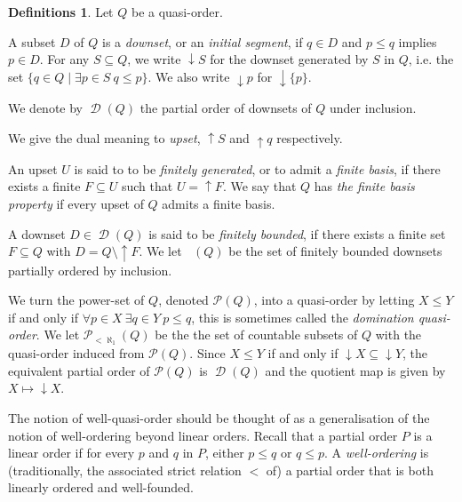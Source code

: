 \documentclass{article}%
\theoremstyle{plain}
\theoremstyle{definition}
\newtheorem{definition}[theorem]{Definition}
\newtheorem{definition}[theorem]{Notation}
\newtheorem{definition}[theorem]{Notations}
\newtheorem{definition}[theorem]{Definitions}
\theoremstyle{remark}
\newcommand{\CtblSubs}{\mathcal{P}_{<\aleph_{1}}}
\DeclareMathOperator{\upcl}{\uparrow}
\DeclareMathOperator{\dcl}{\downarrow}
\DeclareMathOperator{\Down}{\mathcal{D}} %
\DeclareMathOperator{\DownFb}{\Down_{\text{fb}}} %
\begin{document}
\begin{definition}
Let $Q$ be a quasi-order.
\begin{enumDefn}
\item A subset $D$ of $Q$  is a \emph{downset}, or an \emph{initial segment}, if $q\in D$ and $p\leq q$ implies $p\in D$. For any $S\subseteq Q$, we write $\dcl S$ for the downset generated by $S$ in $Q$, i.e. the set $\{q\in Q\mid \exists p\in S \  q\leq p\}$. We also write $\dcl p$ for $\dcl\{p\}$.

We denote by $\Down(Q)$ the partial order of downsets of $Q$ under inclusion.

\item We give the dual meaning to \emph{upset}, $\upcl S$ and $\upcl q$ respectively. 

\item An upset $U$ is said to to be \emph{finitely generated}, or to admit a \emph{finite basis}, if there exists a finite $F\subseteq U$ such that $U=\upcl F$. We say that $Q$ has \emph{the finite basis property} if every upset of $Q$ admits a finite basis.

\item A downset $D\in \Down(Q)$ is said to be \emph{finitely bounded}, if there exists a finite set $F\subseteq Q$ with $D=Q\setminus \upcl F$. We let $\DownFb(Q)$ be the set of finitely bounded downsets partially ordered by inclusion.

\item We turn the power-set of $Q$, denoted $\mathcal{P}(Q)$, into a quasi-order by letting $X\leq Y$ if and only if $\forall p\in X\ \exists q\in Y\ p\leq q$, this is sometimes called the \emph{domination quasi-order}. We let $\CtblSubs(Q)$ be the the set of countable subsets of $Q$ with the quasi-order induced from $\mathcal{P}(Q)$. Since $X\leq Y$ if and only if $\dcl X \subseteq \dcl Y$, the equivalent partial order of $\mathcal{P}(Q)$ is $\Down(Q)$ and the quotient map is given by $X\mapsto \dcl X$.

\end{enumDefn}
\end{definition}

The notion of well-quasi-order should be thought of as a generalisation of the notion of well-ordering beyond linear orders. Recall that a partial order $P$ is a linear order if for every $p$ and $q$ in $P$, either $p\leq q$ or $q\leq p$. A \emph{well-ordering} is (traditionally, the associated strict relation $<$ of) a partial order that is both linearly ordered and well-founded. 
\end{document}
